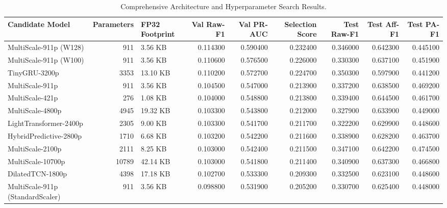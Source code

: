 \begin{table}
\caption{Comprehensive Architecture and Hyperparameter Search Results.}
\begin{tabular}{lrlrrrrrr}
\toprule
Candidate Model & Parameters & FP32 Footprint & Val Raw-F1 & Val PR-AUC & Selection Score & Test Raw-F1 & Test Aff-F1 & Test PA-F1 \\
\midrule
MultiScale-911p (W128) & 911 & 3.56 KB & 0.114300 & 0.590400 & 0.232400 & 0.346000 & 0.642300 & 0.445100 \\
MultiScale-911p (W100) & 911 & 3.56 KB & 0.110600 & 0.576500 & 0.226000 & 0.330300 & 0.637100 & 0.451900 \\
TinyGRU-3200p & 3353 & 13.10 KB & 0.110200 & 0.572700 & 0.224700 & 0.350300 & 0.597900 & 0.441200 \\
MultiScale-911p & 911 & 3.56 KB & 0.104500 & 0.547000 & 0.213900 & 0.337200 & 0.638500 & 0.469200 \\
MultiScale-421p & 276 & 1.08 KB & 0.104000 & 0.548800 & 0.213800 & 0.339400 & 0.644500 & 0.461700 \\
MultiScale-4800p & 4945 & 19.32 KB & 0.103300 & 0.543800 & 0.212000 & 0.327900 & 0.633900 & 0.449000 \\
LightTransformer-2400p & 2305 & 9.00 KB & 0.103300 & 0.541700 & 0.211700 & 0.322200 & 0.629900 & 0.448600 \\
HybridPredictive-2800p & 1710 & 6.68 KB & 0.103200 & 0.542200 & 0.211600 & 0.338900 & 0.628200 & 0.463700 \\
MultiScale-2100p & 2111 & 8.25 KB & 0.103000 & 0.542400 & 0.211500 & 0.347100 & 0.642200 & 0.474500 \\
MultiScale-10700p & 10789 & 42.14 KB & 0.103000 & 0.541800 & 0.211400 & 0.340900 & 0.637300 & 0.466800 \\
DilatedTCN-1800p & 4398 & 17.18 KB & 0.102700 & 0.533300 & 0.209300 & 0.332500 & 0.623100 & 0.448600 \\
MultiScale-911p (StandardScaler) & 911 & 3.56 KB & 0.098800 & 0.531900 & 0.205200 & 0.330700 & 0.625400 & 0.448000 \\
\bottomrule
\end{tabular}
\end{table}
